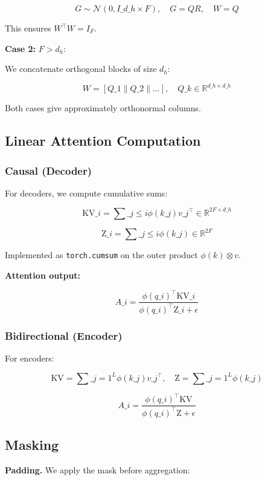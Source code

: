 \[
G \sim \mathcal{N}(0, I\_{d\_h \times F}), \quad G = Q R, \quad W = Q
\tag{4.5}
\]

This ensures $W^\top W = I_F$.

\textbf{Case 2:} $F > d_h$:

We concatenate orthogonal blocks of size $d_h$:

\[
W = [Q\_1 \| Q\_2 \| \dots], \quad Q\_k \in \mathbb{R}^{d\_h \times d\_h}
\tag{4.6}
\]

Both cases give approximately orthonormal columns.

\subsection{Linear Attention Computation}

\subsubsection{Causal (Decoder)}

For decoders, we compute cumulative sums:

\[
\text{KV}\_i = \sum\_{j \leq i} \phi(k\_j) v\_j^\top \in \mathbb{R}^{2F \times d\_h}
\tag{4.7}
\]

\[
\text{Z}\_i = \sum\_{j \leq i} \phi(k\_j) \in \mathbb{R}^{2F}
\tag{4.8}
\]

Implemented as \texttt{torch.cumsum} on the outer product $\phi(k) \otimes v$.

\textbf{Attention output:}

\[
A\_i = \frac{\phi(q\_i)^\top \text{KV}\_i}{\phi(q\_i)^\top \text{Z}\_i + \epsilon}
\tag{4.9}
\]

\subsubsection{Bidirectional (Encoder)}

For encoders:

\[
\text{KV} = \sum\_{j=1}^L \phi(k\_j) v\_j^\top, \quad
\text{Z} = \sum\_{j=1}^L \phi(k\_j)
\tag{4.10}
\]

\[
A\_i = \frac{\phi(q\_i)^\top \text{KV}}{\phi(q\_i)^\top \text{Z} + \epsilon}
\tag{4.11}
\]

\subsection{Masking}

\textbf{Padding.} We apply the mask before aggregation:


